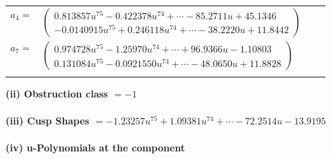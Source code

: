 \documentclass[1p]{elsarticle_modified}
\theoremstyle{definition}
\begin{document}
\begin{tabular}{m{7pt} m{180pt} m{7pt} m{180pt} }
\flushright $a_{4}=$&$\begin{pmatrix}0.813857 u^{75}-0.422378 u^{74}+\cdots-85.2711 u+45.1346\\-0.0140915 u^{75}+0.246118 u^{74}+\cdots-38.2220 u+11.8442\end{pmatrix}$ \\
\flushright $a_{7}=$&$\begin{pmatrix}0.974728 u^{75}-1.25970 u^{74}+\cdots+96.9366 u-1.10803\\0.131084 u^{75}-0.0921550 u^{74}+\cdots-48.0650 u+11.8828\end{pmatrix}$\\&\end{tabular}
\flushleft \textbf{(ii) Obstruction class $= -1$}\\~\\
\flushleft \textbf{(iii) Cusp Shapes $= -1.23257 u^{75}+1.09381 u^{74}+\cdots-72.2514 u-13.9195$}\\~\\
\newpage\renewcommand{\arraystretch}{1}
\flushleft \textbf{(iv) u-Polynomials at the component}\newline \\
\end{document}
